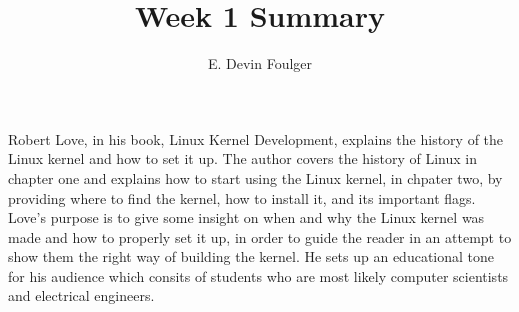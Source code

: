 \documentclass[journal, 10pt]{article}
\def\name{E. Devin Foulger}
\begin{document}
\title{Week 1 Summary}
\author{\name}
\date{} %

\maketitle

Robert Love, in his book, Linux Kernel Development, explains the history of the Linux kernel and how to set it up. 
The author covers the history of Linux in chapter one and explains how to start using the Linux kernel, in chpater two,
by providing where to find the kernel, how to install it, and its important flags. Love's purpose is to give some
insight on when and why the Linux kernel was made and how to properly set it up, in order to guide the reader in an
attempt to show them the right way of building the kernel. He sets up an educational tone for his audience which 
consits of students who are most likely computer scientists and electrical engineers.
\end{document}
